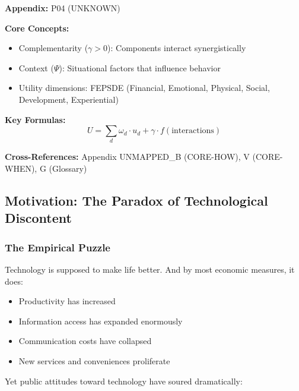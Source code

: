 \begin{tcolorbox}[colback=blue!5!white, colframe=blue!75!black,
    title=Quick Reference: Unknown]

\textbf{Appendix:} P04 (UNKNOWN)

\textbf{Core Concepts:}
\begin{itemize}[nosep]
\item Complementarity ($\gamma > 0$): Components interact synergistically
\item Context ($\Psi$): Situational factors that influence behavior
\item Utility dimensions: FEPSDE (Financial, Emotional, Physical, Social, Development, Experiential)
\end{itemize}

\textbf{Key Formulas:}
\begin{equation}
U = \sum_d \omega_d \cdot u_d + \gamma \cdot f(\text{interactions})
\end{equation}

\textbf{Cross-References:} Appendix UNMAPPED_B (CORE-HOW), V (CORE-WHEN), G (Glossary)
\end{tcolorbox}

\subsection{Motivation: The Paradox of Technological Discontent}

\subsubsection{The Empirical Puzzle}

Technology is supposed to make life better. And by most economic measures, it does:
\begin{itemize}
    \item Productivity has increased
    \item Information access has expanded enormously
    \item Communication costs have collapsed
    \item New services and conveniences proliferate
\end{itemize}

Yet public attitudes toward technology have soured dramatically:

